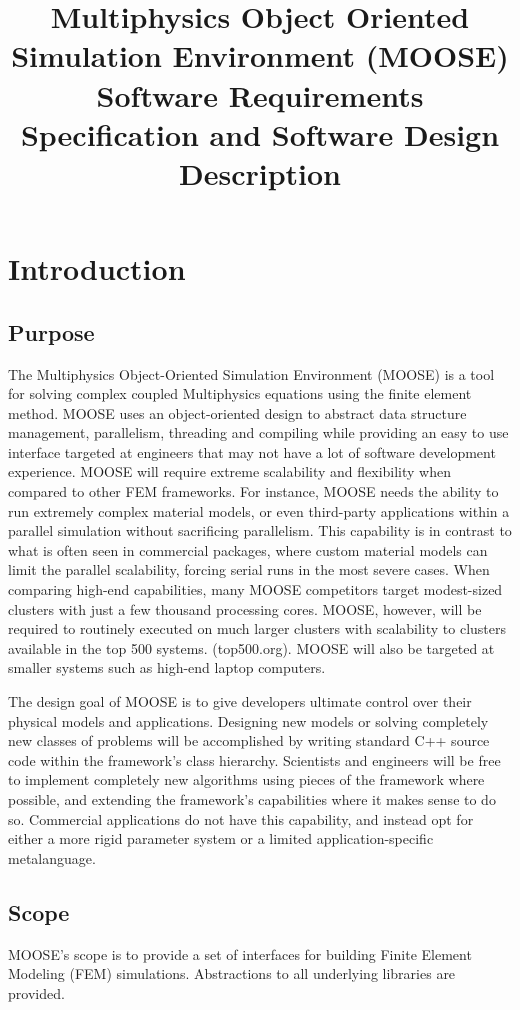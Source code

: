 \documentclass{INLreport}
\title{Multiphysics Object Oriented Simulation Environment (MOOSE) Software Requirements Specification and Software Design Description}
\begin{document}
\maketitle

\SANDmain

\section{Introduction}
\subsection{Purpose}
The Multiphysics Object-Oriented Simulation Environment (MOOSE) is a tool for solving complex coupled Multiphysics equations
using the finite element method. MOOSE uses an object-oriented design to abstract data structure management, parallelism,
threading and compiling while providing an easy to use interface targeted at engineers that may not have a lot of
software development experience. MOOSE will require extreme scalability and flexibility when compared to other FEM
frameworks. For instance, MOOSE needs the ability to run extremely complex material models, or even third-party applications
within a parallel simulation without sacrificing parallelism. This capability is in contrast to what is often seen in
commercial packages, where custom material models can limit the parallel scalability, forcing serial runs in the most severe
cases. When comparing high-end capabilities, many MOOSE competitors target modest-sized clusters with just a few thousand
processing cores. MOOSE, however, will be required to routinely executed on much larger clusters with scalability to clusters
available in the top 500 systems. (top500.org). MOOSE will also be targeted at smaller systems such as high-end laptop
computers.

The design goal of MOOSE is to give developers ultimate control over their physical models and applications. Designing new
models or solving completely new classes of problems will be accomplished by writing standard C++ source code within the
framework’s class hierarchy. Scientists and engineers will be free to implement completely new algorithms using pieces of the
framework where possible, and extending the framework’s capabilities where it makes sense to do so. Commercial applications do
not have this capability, and instead opt for either a more rigid parameter system or a limited application-specific metalanguage.

\subsection{Scope}
MOOSE's scope is to provide a set of interfaces for building Finite Element Modeling (FEM) simulations. Abstractions to all
underlying libraries are provided.
\end{document}
